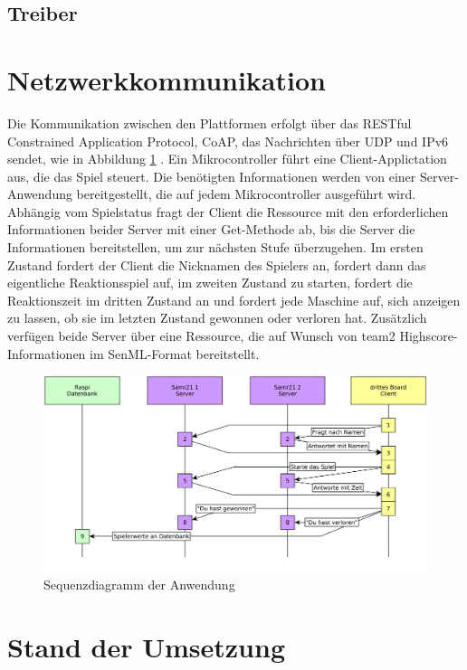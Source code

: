 \documentclass[a4paper]{article}
\begin{document}
\subsection{Treiber}

\section{Netzwerkkommunikation}
\label{sec:net}
Die Kommunikation zwischen den Plattformen erfolgt über das RESTful Constrained Application Protocol, CoAP, das Nachrichten über UDP und IPv6 sendet, wie in Abbildung \ref{fig:seq_diagram} . Ein Mikrocontroller führt eine Client-Applictation aus, die das Spiel steuert. Die benötigten Informationen werden von einer Server-Anwendung bereitgestellt, die auf jedem Mikrocontroller ausgeführt wird. Abhängig vom Spielstatus fragt der Client die Ressource mit den erforderlichen Informationen beider Server mit einer Get-Methode ab, bis die Server die Informationen bereitstellen, um zur nächsten Stufe überzugehen. Im ersten Zustand fordert der Client die Nicknamen des Spielers an, fordert dann das eigentliche Reaktionsspiel auf, im zweiten Zustand zu starten, fordert die Reaktionszeit im dritten Zustand an und fordert jede Maschine auf, sich anzeigen zu lassen, ob sie im letzten Zustand gewonnen oder verloren hat. Zusätzlich verfügen beide Server über eine Ressource, die auf Wunsch von team2 Highscore-Informationen im SenML-Format bereitstellt.
\begin{figure}[h]
\centering
\includegraphics[scale=0.1]{team1_kommunikation.png}
\caption{\label{fig:seq_diagram}Sequenzdiagramm der Anwendung}
\end{figure}

\section{Stand der Umsetzung}
\label{sec:status}
\end{document}
